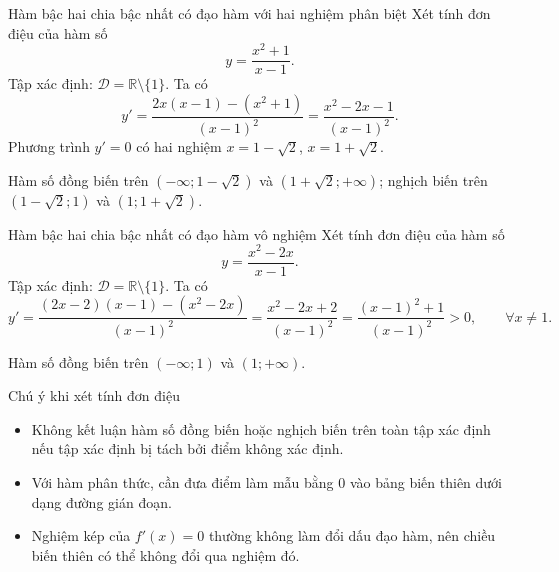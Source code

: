 \begin{vidu}{Hàm bậc hai chia bậc nhất có đạo hàm với hai nghiệm phân biệt}
Xét tính đơn điệu của hàm số
\[
y=\frac{x^2+1}{x-1}.
\]
Tập xác định: $\mathcal{D}=\mathbb{R}\setminus\{1\}$. Ta có
\[
y'=\frac{2x(x-1)-(x^2+1)}{(x-1)^2}
=\frac{x^2-2x-1}{(x-1)^2}.
\]
Phương trình $y'=0$ có hai nghiệm $x=1-\sqrt2$, $x=1+\sqrt2$.

\begin{center}
\end{center}

Hàm số đồng biến trên $(-\infty;1-\sqrt2)$ và $(1+\sqrt2;+\infty)$; nghịch biến
trên $(1-\sqrt2;1)$ và $(1;1+\sqrt2)$.
\end{vidu}

\begin{vidu}{Hàm bậc hai chia bậc nhất có đạo hàm vô nghiệm}
Xét tính đơn điệu của hàm số
\[
y=\frac{x^2-2x}{x-1}.
\]
Tập xác định: $\mathcal{D}=\mathbb{R}\setminus\{1\}$. Ta có
\[
y'=\frac{(2x-2)(x-1)-(x^2-2x)}{(x-1)^2}
=\frac{x^2-2x+2}{(x-1)^2}
=\frac{(x-1)^2+1}{(x-1)^2}>0,\qquad \forall x\ne1.
\]

\begin{center}
\end{center}

Hàm số đồng biến trên $(-\infty;1)$ và $(1;+\infty)$.
\end{vidu}

\begin{chuy}{Chú ý khi xét tính đơn điệu}
\begin{itemize}[leftmargin=2em]
\item Không kết luận hàm số đồng biến hoặc nghịch biến trên toàn tập xác định nếu
tập xác định bị tách bởi điểm không xác định.
\item Với hàm phân thức, cần đưa điểm làm mẫu bằng $0$ vào bảng biến thiên dưới dạng
đường gián đoạn.
\item Nghiệm kép của $f'(x)=0$ thường không làm đổi dấu đạo hàm, nên chiều biến
thiên có thể không đổi qua nghiệm đó.
\end{itemize}
\end{chuy}
